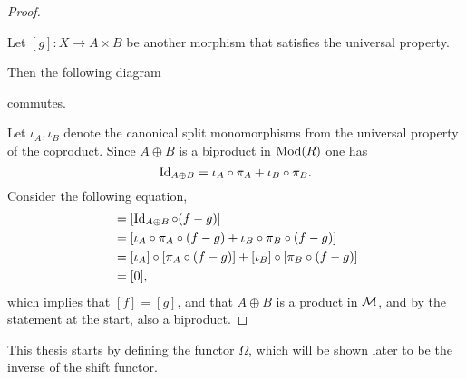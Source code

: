 \begin{proof}
\begin{center}
    \end{center}
    Let \( [g]: X \to A \times B \) be another morphism that satisfies the universal property.

    Then the following diagram
    \begin{center}
    \end{center}
    commutes.

    Let \( \iota_A, \iota_B \) denote the canonical split monomorphisms from the universal property of the coproduct. Since \( A \oplus B \) is a biproduct in \( \operatorname{Mod}(R) \) one has
    \[
        \operatorname{Id}_{A \oplus B} = \iota_A \circ \pi_A + \iota_B \circ \pi_B.
    \]
    Consider the following equation,
    \begin{align*}
        [f - g] &= [\Id_{A \oplus B} \circ (f - g)] \\
        &= [\iota_A \circ \pi_A \circ (f - g) + \iota_B \circ \pi_B \circ (f - g)] \\
        &= [\iota_A] \circ [\pi_A \circ (f - g)] + [\iota_B] \circ [\pi_B \circ (f - g)] \\
        &= [0],
    \end{align*}
    which implies that \( [f] = [g] \), and that \( A \oplus B \) is a product in \( {\mathcal{M}} \), and by the statement at the start, also a biproduct.
\end{proof}

This thesis starts by defining the functor \( \Omega \), which will be shown later to be the inverse of the shift functor.

